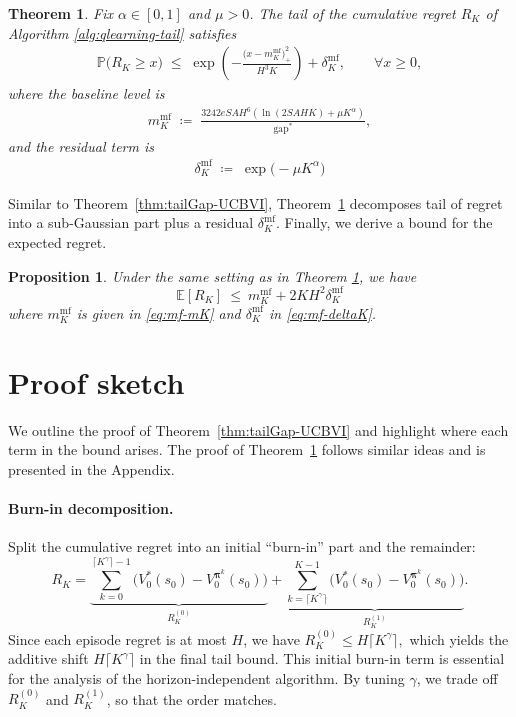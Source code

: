 \documentclass[11pt]{article}
\newcommand{\pii}{\boldsymbol{\pi}}
\newcommand{\PP}{\mathbb{P}}
\newtheorem{prop}{Proposition}
\newtheorem{theorem}{Theorem}
\newcommand{\gapstar}{\mathrm{gap}^*}
\begin{document}
\begin{theorem}
\label{thm:tailGap-Qlearning}
Fix $\alpha\in[0,1]$ and $\mu>0$. The tail of the cumulative regret $R_K$ of Algorithm \ref{alg:qlearning-tail} satisfies
\begin{align}
\PP\!\Big(R_K \ge x\Big)
\;\le\;
\exp\!\left(
-\frac{\big(x  - m_K^{\mathrm{mf}}\big)_+^2}{H^3K}
\right)
+\delta_K^{\mathrm{mf}}, \qquad \forall x\geq 0,
\label{eq:mf-tail-master}
\end{align}
where the baseline level is
\begin{align}
m_K^{\mathrm{mf}}
\;\coloneqq\;
\frac{3242 eSAH^6(\ln(2SAHK)+\mu K^\alpha)}{\gapstar},
\label{eq:mf-mK}
\end{align}
and the residual term is
\begin{align}
\delta_K^{\mathrm{mf}}
\;\coloneqq\;
\exp\!\big(-\mu K^\alpha\big)
\label{eq:mf-deltaK}
\end{align}
\end{theorem}
Similar to Theorem~\ref{thm:tailGap-UCBVI}, Theorem~\ref{thm:tailGap-Qlearning} decomposes tail of regret into a sub-Gaussian part plus a residual $\delta_K^{\mathrm{mf}}$. Finally, we derive a bound for the expected regret.
\begin{prop}
\label{prop:expectGap-UCBQVI}
Under the same setting as in Theorem \ref{thm:tailGap-Qlearning}, we have
\[
\mathbb E[R_K]
\ \le\
m_K^{\mathrm{mf}} + 2 KH^2\delta_K^{\mathrm{mf}}
\]
where $m_K^{\mathrm{mf}}$ is given in \eqref{eq:mf-mK} and $\delta_K^{\mathrm{mf}}$ in \eqref{eq:mf-deltaK}. 
\end{prop}

\section{Proof sketch}

We outline the proof of Theorem~\ref{thm:tailGap-UCBVI} and highlight where each term in the bound arises. The proof of Theorem~\ref{thm:tailGap-Qlearning} follows similar ideas and is presented in the Appendix.

\paragraph{Burn-in decomposition.}
Split the cumulative regret into an initial ``burn-in'' part and the remainder:
\[
R_K
=
\underbrace{\sum_{k=0}^{\lceil K^\gamma\rceil-1}\!\Big(V_0^*(s_0)-V_0^{\pii^k}(s_0)\Big)}_{R_K^{(0)}}
+
\underbrace{\sum_{k=\lceil K^\gamma\rceil}^{K-1}\!\Big(V_0^*(s_0)-V_0^{\pii^k}(s_0)\Big)}_{R_K^{(1)}}.
\]
Since each episode regret is at most $H$, we have $R_K^{(0)} \le H\lceil K^\gamma\rceil,$ which yields the additive shift $H\lceil K^\gamma\rceil$ in the final tail bound. This initial burn-in term is essential for the analysis of the horizon-independent algorithm. 
By tuning $\gamma$, we trade off $R_K^{(0)}$ and $R_K^{(1)}$, so that the order matches.
\end{document}
